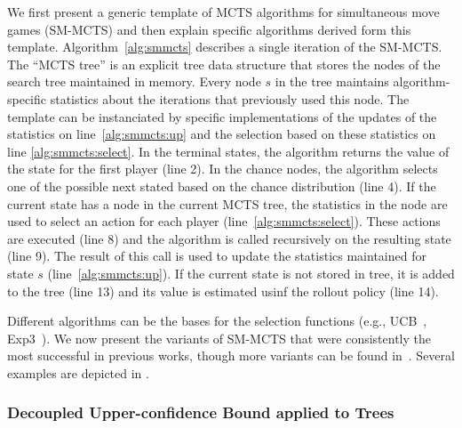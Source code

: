 We first present a generic template of MCTS algorithms for simultaneous move games (SM-MCTS) and then explain specific algorithms derived form this template.
Algorithm~\ref{alg:smmcts} describes a single iteration of the SM-MCTS. 
The ``MCTS tree'' is an explicit tree data structure that stores the nodes of the search tree maintained in memory. 
Every node $s$ in the tree maintains algorithm-specific statistics about the iterations that previously used this node.
The template can be instanciated by specific implementations of the updates of the statistics on line~\ref{alg:smmcts:up} and the selection based on these statistics on line \ref{alg:smmcts:select}.
In the terminal states, the algorithm returns the value of the state for the first player (line 2).
In the chance nodes, the algorithm selects one of the possible next stated based on the chance distribution (line 4).
If the current state has a node in the current MCTS tree, the statistics in the node are used to select an action for each player (line~\ref{alg:smmcts:select}).
These actions are executed (line 8) and the algorithm is called recursively on the resulting state (line 9).
The result of this call is used to update the statistics maintained for state $s$ (line~\ref{alg:smmcts:up}).
If the current state is not stored in tree, it is added to the tree (line 13) and its value is estimated usinf the rollout policy (line 14).

Different algorithms can be the bases for the selection functions (e.g., UCB~\cite{UCB}, Exp3~\cite{Auer2003Exp3}).
We now present the variants of SM-MCTS that were consistently the most successful in previous works, though more variants can be found in~\cite{Perick12Comparison,Lanctot13Tron,Tak14smmcts}.
Several examples are depicted in \cite{Tak14smmcts}. 

\subsubsection{Decoupled Upper-confidence Bound applied to Trees}\label{sec:duct}

